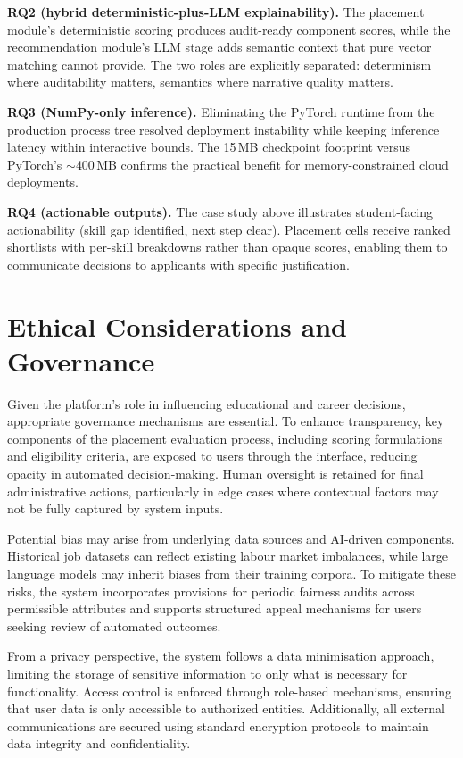 \documentclass[conference]{IEEEtran}
\begin{document}
\textbf{RQ2 (hybrid deterministic-plus-LLM explainability).} The
placement module's deterministic scoring produces audit-ready component
scores, while the recommendation module's LLM stage adds semantic
context that pure vector matching cannot provide. The two roles are
explicitly separated: determinism where auditability matters, semantics
where narrative quality matters.

\textbf{RQ3 (NumPy-only inference).} Eliminating the PyTorch runtime
from the production process tree resolved deployment instability while
keeping inference latency within interactive bounds. The 15\,MB
checkpoint footprint versus PyTorch's $\sim$400\,MB confirms the
practical benefit for memory-constrained cloud deployments.

\textbf{RQ4 (actionable outputs).} The case study above illustrates
student-facing actionability (skill gap identified, next step clear).
Placement cells receive ranked shortlists with per-skill breakdowns
rather than opaque scores, enabling them to communicate decisions to
applicants with specific justification.

\section{Ethical Considerations and Governance}
Given the platform’s role in influencing educational and career
decisions, appropriate governance mechanisms are essential. To enhance
transparency, key components of the placement evaluation process,
including scoring formulations and eligibility criteria, are exposed
to users through the interface, reducing opacity in automated
decision-making. Human oversight is retained for final administrative
actions, particularly in edge cases where contextual factors may not
be fully captured by system inputs.

Potential bias may arise from underlying data sources and AI-driven
components. Historical job datasets can reflect existing labour market
imbalances, while large language models may inherit biases from their
training corpora. To mitigate these risks, the system incorporates
provisions for periodic fairness audits across permissible attributes
and supports structured appeal mechanisms for users seeking review of
automated outcomes.

From a privacy perspective, the system follows a data minimisation
approach, limiting the storage of sensitive information to only what is
necessary for functionality. Access control is enforced through
role-based mechanisms, ensuring that user data is only accessible to
authorized entities. Additionally, all external communications are
secured using standard encryption protocols to maintain data integrity
and confidentiality.
\end{document}
